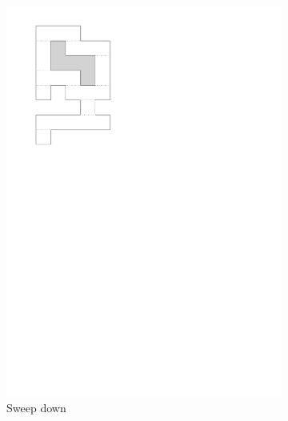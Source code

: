 \documentclass[english,gradu]{tktltiki2018}
\begin{document}
\begin{figure}
\begin{subfigure}[t]{0.15\textwidth}
		\includegraphics[width=\textwidth,page=4]{fig/light2d}
		\caption{Sweep down}\label{fig:light2d:down}
	\end{subfigure}
	\hfil
	\begin{subfigure}[t]{0.15\textwidth}\centering

\end{subfigure}
\end{figure}
\end{document}
